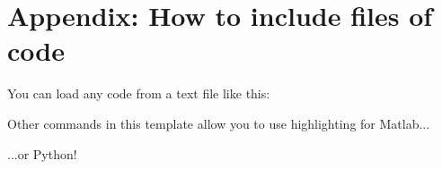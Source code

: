 \documentclass[letterus,times]{SIOpset}
\begin{document}
\section{Appendix: How to include files of code}

You can load any code from a text file like this:

Other commands in this template allow you to use highlighting for Matlab...

...or Python!

\fi %

\end{document}
